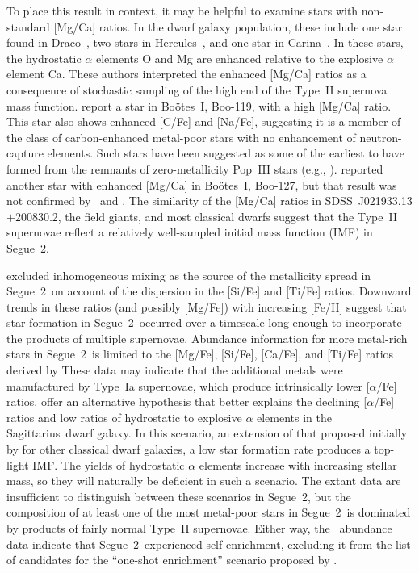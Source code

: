 \documentclass[useAMS,usenatbib,usegraphicx]{mn2e}
\def\seg{\mbox{SDSS~J021933.13$+$200830.2}}
\def\seggal{\mbox{Segue~2}}
\def\boogal{\mbox{Bo\"{o}tes~I}}
\def\hergal{\mbox{Hercules}}
\def\sgrgal{\mbox{Sagittarius}}
\def\dragal{\mbox{Draco}}
\def\cargal{\mbox{Carina}}
\begin{document}
To place this result in context,
it may be helpful to examine 
stars with non-standard [Mg/Ca] ratios.
In the dwarf galaxy population, these include
one star found in \dragal\ \citep*{fulbright04},
two stars in \hergal\ \citep{koch08}, and
one star in \cargal\ \citep{venn12}.
In these stars, the hydrostatic $\alpha$ elements O and Mg
are enhanced relative to the explosive $\alpha$ element Ca.
These authors
interpreted the enhanced [Mg/Ca] ratios as a consequence of
stochastic sampling of the high end of the
Type~II supernova mass function.
\citet{gilmore13} report a star
in \boogal, \mbox{Boo-119}, with a high [Mg/Ca] ratio.
This star also shows enhanced [C/Fe] \citep{lai11} and [Na/Fe],
suggesting it is a member of the class of 
carbon-enhanced metal-poor stars with
no enhancement of neutron-capture elements.
Such stars have been suggested as 
some of the earliest to have formed from the 
remnants of zero-metallicity Pop~III stars (e.g., \citealt{norris13}).
\citet{feltzing09} reported another star with enhanced [Mg/Ca] 
in \boogal, \mbox{Boo-127}, but that result was not confirmed
by \citeauthor{gilmore13}\ and \citet{ishigaki14}.
The similarity of the [Mg/Ca] ratios in \seg,
the field giants, and most classical dwarfs
suggest that the Type~II supernovae
reflect a relatively well-sampled initial mass function (IMF) in \seggal.

\citet{kirby13} excluded inhomogeneous mixing as the
source of the metallicity spread in \seggal\
on account of the dispersion in the
[Si/Fe] and [Ti/Fe] ratios.
Downward trends in these ratios (and possibly [Mg/Fe])
with increasing [Fe/H]
suggest that star formation in \seggal\ occurred
over a timescale long enough to incorporate the
products of multiple supernovae.
Abundance information for more metal-rich stars in
\seggal\ is limited to the 
[Mg/Fe], [Si/Fe], [Ca/Fe], and [Ti/Fe] ratios
derived by \citeauthor{kirby13} %
These data may indicate that the additional metals were
manufactured by Type~Ia supernovae, which produce
intrinsically lower [$\alpha$/Fe] ratios.
\citet{mcwilliam13} offer an alternative hypothesis
that better explains the declining [$\alpha$/Fe] ratios
and low ratios of hydrostatic to explosive $\alpha$ elements
in the \sgrgal\ dwarf galaxy.
In this scenario, an extension of that proposed initially
by \citet{tolstoy03} for other classical dwarf galaxies,
a low star formation rate
produces a top-light IMF.
The yields of hydrostatic $\alpha$ elements 
increase with increasing stellar mass, so they will
naturally be deficient in such a scenario.
The extant data are insufficient to
distinguish between these scenarios in \seggal,
but the composition of 
at least one of the most metal-poor stars in \seggal\
is dominated by products of
fairly normal Type~II supernovae.
Either way, the \citeauthor{kirby13}\ abundance data
indicate that \seggal\ experienced self-enrichment,
excluding it from the list of candidates
for the ``one-shot enrichment'' scenario proposed by \citet{frebel12}.
\end{document}
